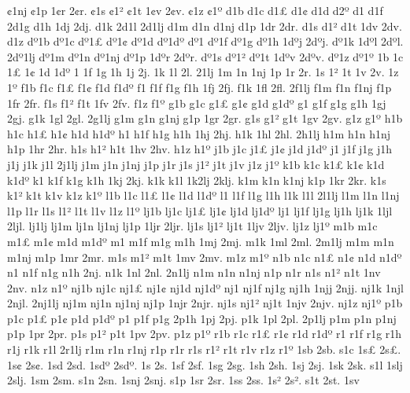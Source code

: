 {^^a21nj
^^a21p
1^^a2r
2^^a2r.
^^a21s
^^a21^^b2
^^a21t
1^^a2v
2^^a2v.
^^a21z
^^a21^^ba
d1b
d1c
d1^^a3
d1^^a2
d1d
d2^^ba
d1^^9e
d1f
2d1g
d1h
1dj
2dj.
d1k
2d1l
2d1lj
d1m
d1n
d1nj
d1p
1dr
2dr.
d1s
d1^^b2
d1t
1dv
2dv.
d1z
d^^ba1b
d^^ba1c
d^^ba1^^a3
d^^ba1^^a2
d^^ba1d
d^^ba1d^^ba
d^^ba1^^9e
d^^ba1f
d^^ba1g
d^^ba1h
1d^^baj
2d^^baj.
d^^ba1k
1d^^bal
2d^^bal.
2d^^ba1lj
d^^ba1m
d^^ba1n
d^^ba1nj
d^^ba1p
1d^^bar
2d^^bar.
d^^ba1s
d^^ba1^^b2
d^^ba1t
1d^^bav
2d^^bav.
d^^ba1z
d^^ba1^^ba
^^9e1b
^^9e1c
^^9e1^^a3
^^9e1^^a2
^^9e1d
^^9e1d^^ba
^^9e1^^9e
^^9e1f
^^9e1g
^^9e1h
1^^9ej
2^^9ej.
^^9e1k
1^^9el
2^^9el.
2^^9e1lj
^^9e1m
^^9e1n
^^9e1nj
^^9e1p
1^^9er
2^^9er.
^^9e1s
^^9e1^^b2
^^9e1t
1^^9ev
2^^9ev.
^^9e1z
^^9e1^^ba
f1b
f1c
f1^^a3
f1^^a2
f1d
f1d^^ba
f1^^9e
f1f
f1g
f1h
1fj
2fj.
f1k
1fl
2fl.
2f1lj
f1m
f1n
f1nj
f1p
1fr
2fr.
f1s
f1^^b2
f1t
1fv
2fv.
f1z
f1^^ba
g1b
g1c
g1^^a3
g1^^a2
g1d
g1d^^ba
g1^^9e
g1f
g1g
g1h
1gj
2gj.
g1k
1gl
2gl.
2g1lj
g1m
g1n
g1nj
g1p
1gr
2gr.
g1s
g1^^b2
g1t
1gv
2gv.
g1z
g1^^ba
h1b
h1c
h1^^a3
h1^^a2
h1d
h1d^^ba
h1^^9e
h1f
h1g
h1h
1hj
2hj.
h1k
1hl
2hl.
2h1lj
h1m
h1n
h1nj
h1p
1hr
2hr.
h1s
h1^^b2
h1t
1hv
2hv.
h1z
h1^^ba
j1b
j1c
j1^^a3
j1^^a2
j1d
j1d^^ba
j1^^9e
j1f
j1g
j1h
j1j
j1k
j1l
2j1lj
j1m
j1n
j1nj
j1p
j1r
j1s
j1^^b2
j1t
j1v
j1z
j1^^ba
k1b
k1c
k1^^a3
k1^^a2
k1d
k1d^^ba
k1^^9e
k1f
k1g
k1h
1kj
2kj.
k1k
k1l
1k2lj
2klj.
k1m
k1n
k1nj
k1p
1kr
2kr.
k1s
k1^^b2
k1t
k1v
k1z
k1^^ba
l1b
l1c
l1^^a3
l1^^a2
l1d
l1d^^ba
l1^^9e
l1f
l1g
l1h
l1k
l1l
2l1lj
l1m
l1n
l1nj
l1p
l1r
l1s
l1^^b2
l1t
l1v
l1z
l1^^ba
lj1b
lj1c
lj1^^a3
lj1^^a2
lj1d
lj1d^^ba
lj1^^9e
lj1f
lj1g
lj1h
lj1k
1ljl
2ljl.
lj1lj
lj1m
lj1n
lj1nj
lj1p
1ljr
2ljr.
lj1s
lj1^^b2
lj1t
1ljv
2ljv.
lj1z
lj1^^ba
m1b
m1c
m1^^a3
m1^^a2
m1d
m1d^^ba
m1^^9e
m1f
m1g
m1h
1mj
2mj.
m1k
1ml
2ml.
2m1lj
m1m
m1n
m1nj
m1p
1mr
2mr.
m1s
m1^^b2
m1t
1mv
2mv.
m1z
m1^^ba
n1b
n1c
n1^^a3
n1^^a2
n1d
n1d^^ba
n1^^9e
n1f
n1g
n1h
2nj.
n1k
1nl
2nl.
2n1lj
n1m
n1n
n1nj
n1p
n1r
n1s
n1^^b2
n1t
1nv
2nv.
n1z
n1^^ba
nj1b
nj1c
nj1^^a3
nj1^^a2
nj1d
nj1d^^ba
nj1^^9e
nj1f
nj1g
nj1h
1njj
2njj.
nj1k
1njl
2njl.
2nj1lj
nj1m
nj1n
nj1nj
nj1p
1njr
2njr.
nj1s
nj1^^b2
nj1t
1njv
2njv.
nj1z
nj1^^ba
p1b
p1c
p1^^a3
p1^^a2
p1d
p1d^^ba
p1^^9e
p1f
p1g
2p1h
1pj
2pj.
p1k
1pl
2pl.
2p1lj
p1m
p1n
p1nj
p1p
1pr
2pr.
p1s
p1^^b2
p1t
1pv
2pv.
p1z
p1^^ba
r1b
r1c
r1^^a3
r1^^a2
r1d
r1d^^ba
r1^^9e
r1f
r1g
r1h
r1j
r1k
r1l
2r1lj
r1m
r1n
r1nj
r1p
r1r
r1s
r1^^b2
r1t
r1v
r1z
r1^^ba
1sb
2sb.
s1c
1s^^a3
2s^^a3.
1s^^a2
2s^^a2.
1sd
2sd.
1sd^^ba
2sd^^ba.
1s^^9e
2s^^9e.
1sf
2sf.
1sg
2sg.
1sh
2sh.
1sj
2sj.
1sk
2sk.
s1l
1slj
2slj.
1sm
2sm.
s1n
2sn.
1snj
2snj.
s1p
1sr
2sr.
1ss
2ss.
1s^^b2
2s^^b2.
s1t
2st.
1sv
}
